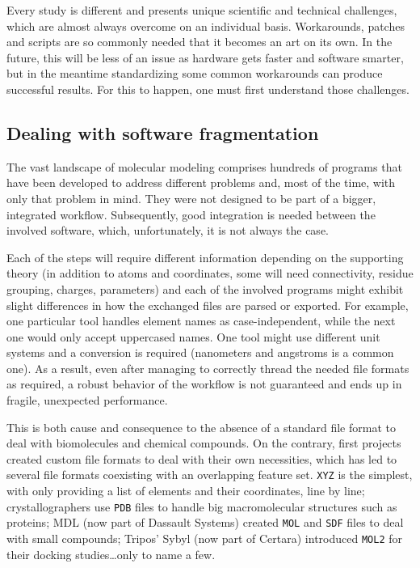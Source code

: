Every study is different and presents unique scientific and technical challenges, which are almost always overcome on an individual basis. Workarounds, patches and scripts are so commonly needed that it becomes an art on its own. In the future, this will be less of an issue as hardware gets faster and software smarter, but in the meantime standardizing some common workarounds can produce successful results. For this to happen, one must first understand those challenges.

\subsection{Dealing with software fragmentation}

The vast landscape of molecular modeling comprises hundreds of programs that have been developed to address different problems and, most of the time, with only that problem in mind. They were not designed to be part of a bigger, integrated workflow. Subsequently, good integration is needed between the involved software, which, unfortunately, it is not always the case.

Each of the steps will require different information depending on the supporting theory (in addition to atoms and coordinates, some will need connectivity, residue grouping, charges, parameters) and each of the involved programs might exhibit slight differences in how the exchanged files are parsed or exported. For example, one particular tool handles element names as case-independent, while the next one would only accept uppercased names. One tool might use different unit systems and a conversion is required (nanometers and angstroms is a common one). As a result, even after managing to correctly thread the needed file formats as required, a robust behavior of the workflow is not guaranteed and ends up in fragile, unexpected performance.

This is both cause and consequence to the absence of a standard file format to deal with biomolecules and chemical compounds. On the contrary, first projects created custom file formats to deal with their own necessities, which has led to several file formats coexisting with an overlapping feature set. \texttt{XYZ} is the simplest, with only providing a list of elements and their coordinates, line by line; crystallographers use \texttt{PDB} files to handle big macromolecular structures such as proteins; MDL (now part of Dassault Systems) created \texttt{MOL} and \texttt{SDF} files to deal with small compounds; Tripos’ Sybyl (now part of Certara) introduced \texttt{MOL2} for their docking studies\ldots  only to name a few.

